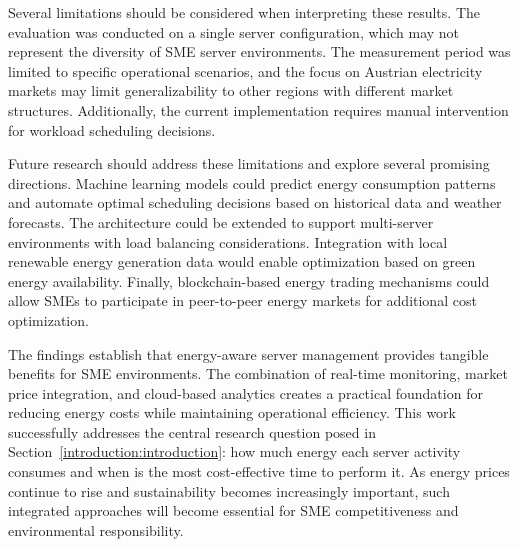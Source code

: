 Several limitations should be considered when interpreting these results. The evaluation was conducted on a single server configuration, which may not represent the diversity of SME server environments. The measurement period was limited to specific operational scenarios, and the focus on Austrian electricity markets may limit generalizability to other regions with different market structures. Additionally, the current implementation requires manual intervention for workload scheduling decisions.

Future research should address these limitations and explore several promising directions. Machine learning models could predict energy consumption patterns and automate optimal scheduling decisions based on historical data and weather forecasts. The architecture could be extended to support multi-server environments with load balancing considerations. Integration with local renewable energy generation data would enable optimization based on green energy availability. Finally, blockchain-based energy trading mechanisms could allow SMEs to participate in peer-to-peer energy markets for additional cost optimization.

The findings establish that energy-aware server management provides tangible benefits for SME environments. The combination of real-time monitoring, market price integration, and cloud-based analytics creates a practical foundation for reducing energy costs while maintaining operational efficiency. This work successfully addresses the central research question posed in Section~\ref{introduction:introduction}: how much energy each server activity consumes and when is the most cost-effective time to perform it. As energy prices continue to rise and sustainability becomes increasingly important, such integrated approaches will become essential for SME competitiveness and environmental responsibility.